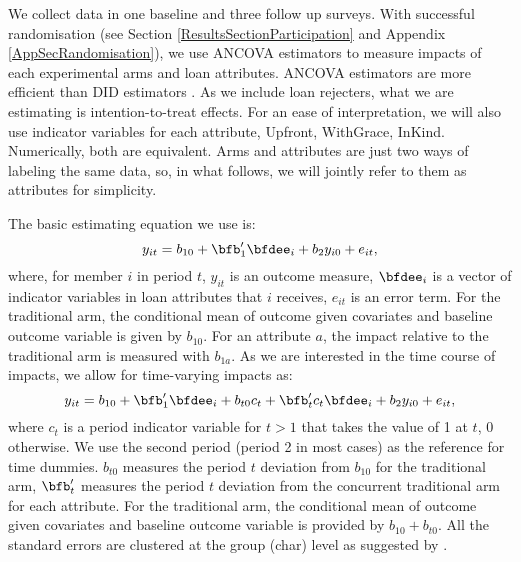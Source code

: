 	We collect data in one baseline and three follow up surveys. With successful randomisation (see Section \ref{ResultsSectionParticipation} and Appendix \ref{AppSecRandomisation}), we use ANCOVA estimators to measure impacts of each experimental arms and loan attributes. ANCOVA estimators are more efficient than DID estimators \citep{FrisonPocock1992, McKenzie2012}. As we include loan rejecters, what we are estimating is intention-to-treat effects. For an ease of interpretation, we will also use indicator variables for each attribute, \textsf{Upfront, WithGrace, InKind}. Numerically, both are equivalent. Arms and attributes are just two ways of labeling the same data, so, in what follows, we will jointly refer to them as attributes for simplicity.
	
	The basic estimating equation we use is:
	\begin{equation}
	y_{it}=b_{10}+\bfb'_{1}\bfdee_{i}+b_{2}y_{i0}+e_{it},
	\end{equation}
	where, for member $i$ in period $t$, $y_{it}$ is an outcome measure, $\bfdee_{i}$ is a vector of indicator variables in loan attributes that $i$ receives, $e_{it}$ is an error term. For the \textsf{traditional} arm, the conditional mean of outcome given covariates and baseline outcome variable is given by $b_{10}$. For an attribute $a$, the impact relative to the traditional arm is measured with $b_{1a}$. As we are interested in the time course of impacts, we allow for time-varying impacts as:
	\begin{equation}
	y_{it}=b_{10}+\bfb'_{1}\bfdee_{i}+b_{t0}c_{t}+\bfb'_{t}c_{t}\bfdee_{i}+b_{2}y_{i0}+e_{it},
	\label{EstimatingEqTimeVarying}
	\end{equation}
	where $c_{t}$ is a period indicator variable for $t>1$ that takes the value of 1 at $t$, 0 otherwise. We use the second period (period 2 in most cases) as the reference for time dummies. $b_{t0}$ measures the period $t$ deviation from $b_{10}$ for the \textsf{traditional} arm, $\bfb'_{t}$ measures the period $t$ deviation from the concurrent \textsf{traditional} arm for each attribute. For the \textsf{traditional} arm, the conditional mean of outcome given covariates and baseline outcome variable is provided by $b_{10}+b_{t0}$. All the standard errors are clustered at the group (char) level as suggested by \citet{AbadieAtheyImbensWooldridge2017}.%


